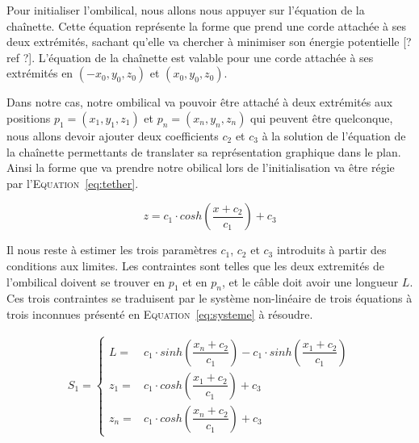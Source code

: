 				Pour initialiser l'ombilical, nous allons nous appuyer sur l'équation de la chaînette. Cette équation représente la forme que prend une corde attachée à ses deux extrémités, sachant qu'elle va chercher à minimiser son énergie potentielle [? ref ?]. L'équation de la chaînette est valable pour une corde attachée à ses extrémités en $(-x_0, y_0, z_0)$ et $(x_0, y_0, z_0)$.
				
				Dans notre cas, notre ombilical va pouvoir être attaché à deux extrémités aux positions $p_1 = (x_1, y_1, z_1)$ et $p_n = (x_n, y_n, z_n)$ qui peuvent être quelconque, nous allons devoir ajouter deux coefficients $c_2$ et $c_3$ à la solution de l'équation de la chaînette permettants de translater sa représentation graphique dans le plan. Ainsi la forme que va prendre notre obilical lors de l'initialisation va être régie par l'\textsc{Equation}~\ref{eq:tether}.
			
				\begin{equation}
					z = c_1\cdot cosh\left(\frac{x + c_2}{c_1}\right) + c_3
					\label{eq:tether}
				\end{equation}
			
				Il nous reste à estimer les trois paramètres $c_1$, $c_2$ et $c_3$ introduits à partir des conditions aux limites. Les contraintes sont telles que les deux extremités de l'ombilical doivent se trouver en $p_1$ et en $p_n$, et le câble doit avoir une longueur $L$. Ces trois contraintes se traduisent par le système non-linéaire de trois équations à trois inconnues présenté en \textsc{Equation}~\ref{eq:systeme} à résoudre.
				
				\begin{align}
					S_1 = 
					\begin{cases}
						L   = & c_1 \cdot sinh\left(\dfrac{x_n+c_2}{c_1}\right) - c_1 \cdot sinh\left(\dfrac{x_1+c_2}{c_1}\right) \\
						z_1 = & c_1 \cdot cosh\left(\dfrac{x_1+c_2}{c_1}\right)+c_3 \\
						z_n = & c_1 \cdot cosh\left(\dfrac{x_n+c_2}{c_1}\right)+c_3
					\end{cases}
					\label{eq:systeme}
				\end{align}
			
